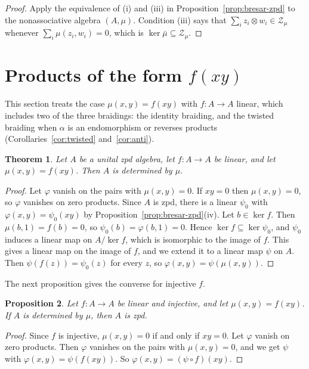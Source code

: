 \documentclass[]{interact}
\theoremstyle{plain}
\newtheorem{theorem}{Theorem}[section]
\newtheorem{proposition}[theorem]{Proposition}
\theoremstyle{definition}
\theoremstyle{remark}
\newcommand{\Zs}{\mathcal{Z}}
\begin{document}
\begin{proof}
Apply the equivalence of (i) and (iii) in Proposition~\ref{prop:bresar-zpd} to the nonassociative algebra $(A,\mu)$.
Condition (iii) says that $\sum_i z_i \otimes w_i \in \Zs_\mu$ whenever $\sum_i \mu(z_i,w_i) = 0$, which is $\ker \bar\mu \subseteq \Zs_\mu$.
\end{proof}

\section{Products of the form \texorpdfstring{$f(xy)$}{f(xy)}}\label{sec:fxy}

This section treats the case $\mu(x,y) = f(xy)$ with $f \colon A \to A$ linear, which includes two of the three braidings: the identity braiding, and the twisted braiding when $\alpha$ is an endomorphism or reverses products (Corollaries~\ref{cor:twisted} and~\ref{cor:anti}).

\begin{theorem}\label{thm:zpd-fxy}
Let $A$ be a unital zpd algebra, let $f \colon A \to A$ be linear, and let $\mu(x,y) = f(xy)$.
Then $A$ is determined by $\mu$.
\end{theorem}

\begin{proof}
Let $\varphi$ vanish on the pairs with $\mu(x,y) = 0$.
If $xy = 0$ then $\mu(x,y) = 0$, so $\varphi$ vanishes on zero products.
Since $A$ is zpd, there is a linear $\psi_0$ with $\varphi(x,y) = \psi_0(xy)$ by Proposition~\ref{prop:bresar-zpd}(iv).
Let $b \in \ker f$.
Then $\mu(b,1) = f(b) = 0$, so $\psi_0(b) = \varphi(b,1) = 0$.
Hence $\ker f \subseteq \ker \psi_0$, and $\psi_0$ induces a linear map on $A/\ker f$, which is isomorphic to the image of $f$.
This gives a linear map on the image of $f$, and we extend it to a linear map $\psi$ on $A$.
Then $\psi(f(z)) = \psi_0(z)$ for every $z$, so $\varphi(x,y) = \psi(\mu(x,y))$.
\end{proof}

The next proposition gives the converse for injective $f$.

\begin{proposition}\label{prop:injective}
Let $f \colon A \to A$ be linear and injective, and let $\mu(x,y) = f(xy)$.
If $A$ is determined by $\mu$, then $A$ is zpd.
\end{proposition}

\begin{proof}
Since $f$ is injective, $\mu(x,y) = 0$ if and only if $xy = 0$.
Let $\varphi$ vanish on zero products.
Then $\varphi$ vanishes on the pairs with $\mu(x,y) = 0$, and we get $\psi$ with $\varphi(x,y) = \psi(f(xy))$.
So $\varphi(x,y) = (\psi \circ f)(xy)$.
\end{proof}
\end{document}
